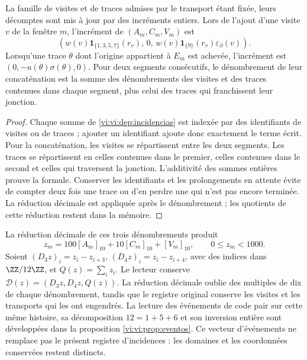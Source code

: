 \begin{proposition}
\label{vi:vi:dep:libro-actualizacion}
La famille de visites et de traces admises par le transport étant fixée, leurs
décomptes sont mis à jour par des incréments entiers. Lors de l'ajout d'une
visite \(v\) de la fenêtre \(m\), l'incrément de \((A_m,C_m,V_m)\) est
\[
 \left(w(v)\mathbf1_{\{1,3,5,7\}}(r_v),\,0,\,
 w(v)\mathbf1_{\{9\}}(r_v)\varepsilon_\partial(v)\right).
\]
Lorsqu’une trace \(\theta\) dont l’origine appartient à \(E_m\) est achevée,
l’incrément est \((0,-u(\theta)\sigma(\theta),0)\).
Pour deux segments consécutifs, le dénombrement de leur concaténation est
la somme des dénombrements des visites et des traces contenues dans chaque
segment, plus celui des traces qui franchissent leur jonction.
\end{proposition}
\begin{proof}
Chaque somme de \eqref{vi:vi:dep:incidencias} est indexée par des identifiants
de visites ou de traces ; ajouter un identifiant ajoute donc
exactement le terme écrit. Pour la concaténation, les visites
se répartissent entre les deux segments. Les traces se répartissent en
celles contenues dans le premier, celles contenues dans le second et celles
qui traversent la jonction. L’additivité des sommes entières prouve
la formule. Conserver les identifiants et les prolongements
en attente évite de compter deux fois une trace ou d’en perdre une qui
n’est pas encore terminée. La réduction décimale est appliquée après le
dénombrement ; les quotients de cette réduction restent dans la mémoire.
\end{proof}

La réduction décimale de ces trois dénombrements produit
\begin{equation}
 z_m=100[A_m]_{10}+10[C_m]_{10}+[V_m]_{10},
 \qquad 0\le z_m<1000.
 \label{vi:vi:dep:bloque-incidencial}
\end{equation}
Soient \((D_3z)_i=z_i-z_{i+3}\),
\((D_4z)_i=z_i-z_{i+4}\), avec des indices dans \(\ZZ/12\ZZ\), et
\(Q(z)=\sum_i z_i\). Le lecteur conserve
\(\mathcal D(z)=(D_3z,D_4z,Q(z))\). La réduction décimale oublie des
multiples de dix de chaque dénombrement, tandis que le registre original conserve
les visites et les transports qui les ont engendrés.
La lecture des événements de code pair sur cette même histoire,
sa décomposition \(12=1+5+6\) et son inversion entière sont
développées dans la proposition \ref{vi:vi:prop:eventos}. Ce vecteur
d’événements ne remplace pas le présent registre d’incidences :
les domaines et les coordonnées conservées restent distincts.

